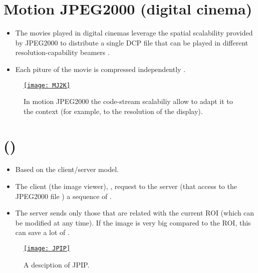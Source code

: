 \section{Motion JPEG2000 (digital cinema)}
\begin{itemize}
\item The movies played in digital cinemas leverage the spatial
  scalability provided by JPEG2000 to distribute a single DCP file
  that can be played in different resolution-capability beamers
  \cite{wikipedia_DCP}.
\item Each piture of the movie is compressed independently
  \cite{DigitalCinema}.
\end{itemize}

\begin{figure}[H]
  \vspace{-2ex}
  \centering
  \href{https://vicente-gonzalez-ruiz.github.io/JPEG2000/}{\texttt{[image: MJ2K]}}
  \caption{In motion JPEG2000 the code-stream scalabiliy allow to
    adapt it to the context (for example, to the resolution of the
    display).}
  \label{fig:J2K_motion}
\end{figure}

\section{ ({)}}
\begin{itemize}
\item Based on the client/server model.
\item The client (the image viewer), , request to the server (that access to the
  JPEG2000 file ) a sequence
  of  \cite{ORTIZ04b}.
\item The server sends only those  that are related with the current
  \gls{ROI} (which can be modified at any time). If the image is very
  big compared to the \gls{ROI}, this can save a lot of
  .
\end{itemize}

\begin{figure}[H]
  \vspace{-1ex}
  \centering
  \href{http://www.hpca.ual.es/~vruiz/papers/ORTIZ04c.pdf}{\texttt{[image: JPIP]}}
  \caption{A desciption of \gls{JPIP}.}
  \label{fig:J2K_JPIP}
\end{figure}

